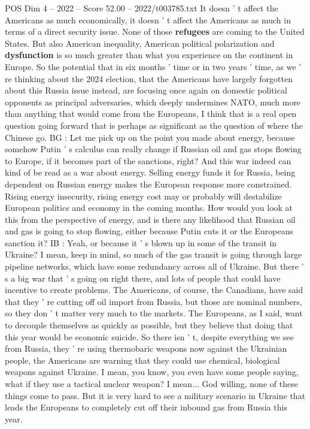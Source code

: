 \begin{textsample}{POS Dim 4 – 2022 – Score 52.00 – 2022/t003785.txt}
It doesn ' t affect the Americans as much economically, it doesn ' t affect the Americans as much in terms of a direct security issue.
None of those \textbf{refugees} are coming to the United States.
But also American inequality, American political polarization and \textbf{dysfunction} is so much greater than what you experience on the continent in Europe.
So the potential that in six months ' time or in two years ' time, as we ' re thinking about the 2024 election, that the Americans have largely forgotten about this Russia issue instead, are focusing once again on domestic political opponents as principal adversaries, which deeply undermines NATO, much more than anything that would come from the Europeans, I think that is a real open question going forward that is perhaps as significant as the question of where the Chinese go.
BG : Let me pick up on the point you made about energy, because somehow Putin ' s calculus can really change if Russian oil and gas stops flowing to Europe, if it becomes part of the sanctions, right?
And this war indeed can kind of be read as a war about energy.
Selling energy funds it for Russia, being dependent on Russian energy makes the European response more constrained.
Rising energy insecurity, rising energy cost may or probably will destabilize European politics and economy in the coming months.
How would you look at this from the perspective of energy, and is there any likelihood that Russian oil and gas is going to stop flowing, either because Putin cuts it or the Europeans sanction it?
IB : Yeah, or because it ' s blown up in some of the transit in Ukraine?
I mean, keep in mind, so much of the gas transit is going through large pipeline networks, which have some redundancy across all of Ukraine.
But there ' s a big war that ' s going on right there, and lots of people that could have incentive to create problems.
The Americans, of course, the Canadians, have said that they ' re cutting off oil import from Russia, but those are nominal numbers, so they don ' t matter very much to the markets.
The Europeans, as I said, want to decouple themselves as quickly as possible, but they believe that doing that this year would be economic suicide.
So there isn ' t, despite everything we see from Russia, they ' re using thermobaric weapons now against the Ukrainian people, the Americans are warning that they could use chemical, biological weapons against Ukraine.
I mean, you know, you even have some people saying, what if they use a tactical nuclear weapon?
I mean...
God willing, none of these things come to pass.
But it is very hard to see a military scenario in Ukraine that leads the Europeans to completely cut off their inbound gas from Russia this year.

\end{textsample}
